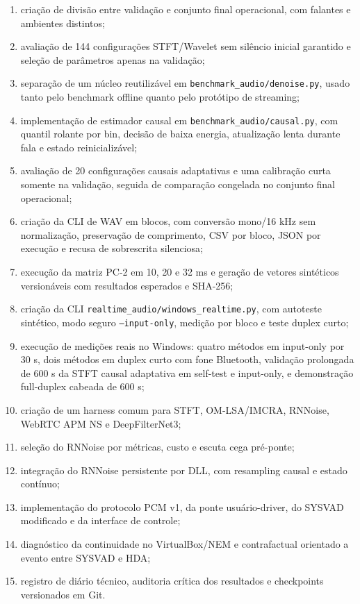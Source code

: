 \begin{enumerate}[label=\arabic*.]
    \item criação de divisão entre validação e conjunto final operacional, com falantes e ambientes distintos;
    \item avaliação de 144 configurações STFT/Wavelet sem silêncio inicial garantido e seleção de parâmetros apenas na validação;
    \item separação de um núcleo reutilizável em \texttt{benchmark\_audio/denoise.py}, usado tanto pelo benchmark offline quanto pelo protótipo de streaming;
    \item implementação de estimador causal em \texttt{benchmark\_audio/causal.py}, com quantil rolante por bin, decisão de baixa energia, atualização lenta durante fala e estado reinicializável;
    \item avaliação de 20 configurações causais adaptativas e uma calibração curta somente na validação, seguida de comparação congelada no conjunto final operacional;
    \item criação da CLI de WAV em blocos, com conversão mono/16 kHz sem normalização, preservação de comprimento, CSV por bloco, JSON por execução e recusa de sobrescrita silenciosa;
    \item execução da matriz PC-2 em 10, 20 e 32 ms e geração de vetores sintéticos versionáveis com resultados esperados e SHA-256;
    \item criação da CLI \texttt{realtime\_audio/windows\_realtime.py}, com autoteste sintético, modo seguro \texttt{--input-only}, medição por bloco e teste duplex curto;
    \item execução de medições reais no Windows: quatro métodos em input-only por 30 s, dois métodos em duplex curto com fone Bluetooth, validação prolongada de 600 s da STFT causal adaptativa em self-test e input-only, e demonstração full-duplex cabeada de 600 s;
    \item criação de um harness comum para STFT, OM-LSA/IMCRA, RNNoise, WebRTC APM NS e DeepFilterNet3;
    \item seleção do RNNoise por métricas, custo e escuta cega pré-ponte;
    \item integração do RNNoise persistente por DLL, com resampling causal e estado contínuo;
    \item implementação do protocolo PCM v1, da ponte usuário-driver, do SYSVAD modificado e da interface de controle;
    \item diagnóstico da continuidade no VirtualBox/NEM e contrafactual orientado a evento entre SYSVAD e HDA;
    \item registro de diário técnico, auditoria crítica dos resultados e checkpoints versionados em Git.
\end{enumerate}

